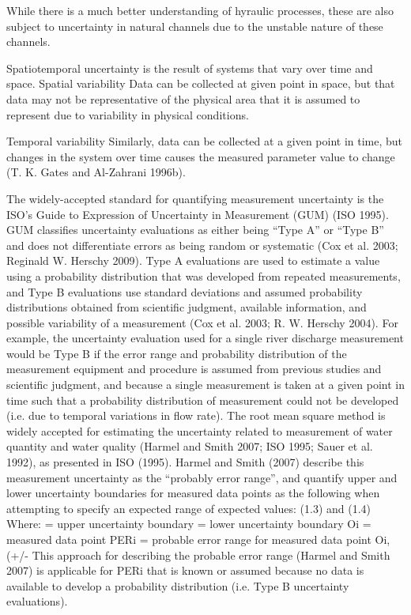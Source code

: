 \begin{linenumbers}
	While there is a much better understanding of hyraulic processes, these are also subject to uncertainty in natural channels due to the unstable nature of these channels.
	

Spatiotemporal uncertainty is the result of systems that vary over time and space.  
Spatial variability
Data can be collected at given point in space, but that data may not be representative of the physical area that it is assumed to represent due to variability in physical conditions.  

Temporal variability
Similarly, data can be collected at a given point in time, but changes in the system over time causes the measured parameter value to change (T. K. Gates and Al-Zahrani 1996b). 
	
The widely-accepted standard for quantifying measurement uncertainty is the ISO’s Guide to Expression of Uncertainty in Measurement (GUM) (ISO 1995).  GUM classifies uncertainty evaluations as either being “Type A” or “Type B” and does not differentiate errors as being random or systematic (Cox et al. 2003; Reginald W. Herschy 2009).  Type A evaluations are used to estimate a value using a probability distribution that was developed from repeated measurements, and Type B evaluations use standard deviations and assumed probability distributions obtained from scientific judgment, available information, and possible variability of a measurement (Cox et al. 2003; R. W. Herschy 2004).  For example, the uncertainty evaluation used for a single river discharge measurement would be Type B if the error range and probability distribution of the measurement equipment and procedure is assumed from previous studies and scientific judgment, and because a single measurement is taken at a given point in time such that a probability distribution of measurement could not be developed (i.e. due to temporal variations in flow rate).
The root mean square method is widely accepted for estimating the uncertainty related to measurement of water quantity and water quality (Harmel and Smith 2007; ISO 1995; Sauer et al. 1992), as presented in ISO (1995).  Harmel and Smith (2007) describe this measurement uncertainty as the “probably error range”, and quantify upper and lower uncertainty boundaries for measured data points as the following when attempting to specify an expected range of expected values:
(1.3)
and
(1.4)
Where:	 = upper uncertainty boundary
= lower uncertainty boundary
Oi = measured data point
PERi = probable error range for measured data point Oi, (+/- %
This approach for describing the probable error range (Harmel and Smith 2007) is applicable for PERi that is known or assumed because no data is available to develop a probability distribution (i.e. Type B uncertainty evaluations).




\end{linenumbers}

